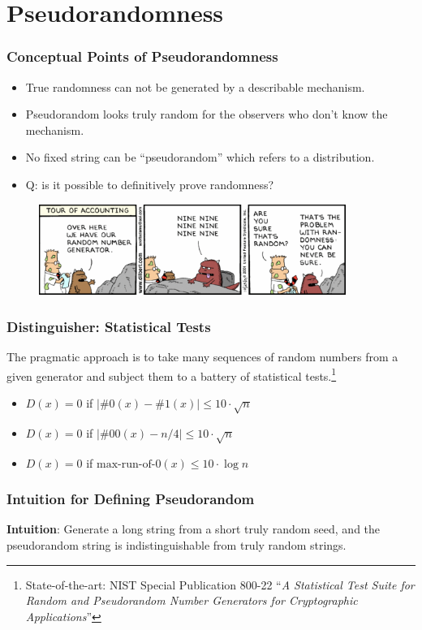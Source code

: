 \section{Pseudorandomness}
\begin{frame}\frametitle{Conceptual Points of Pseudorandomness}
\begin{itemize}
\item True randomness can not be generated by a describable mechanism.
\item Pseudorandom looks truly random for the observers who don't know the mechanism. 
\item No fixed string can be ``pseudorandom'' which refers to a distribution.
\item \alert{Q: is it possible to definitively prove randomness?}
\end{itemize}
\begin{figure}
\begin{center}
\includegraphics[width=100mm]{pic/random-color} 
\end{center}
\end{figure}
\end{frame}
\begin{frame}\frametitle{Distinguisher: Statistical Tests}
The pragmatic approach is to take many sequences of random numbers from a given generator and subject them to a battery of statistical tests.\footnote{State-of-the-art: NIST Special Publication 800-22 ``\emph{A Statistical Test Suite for Random and Pseudorandom Number Generators for Cryptographic Applications}''}
\begin{exampleblock}{}
\begin{itemize}
\item $D(x)=0$ if $\left| \#0(x) - \#1(x)\right| \le 10\cdot \sqrt{n}$
\item $D(x)=0$ if $\left| \#00(x) - n/4\right| \le 10\cdot \sqrt{n}$
\item $D(x)=0$ if $\text{max-run-of-}0(x) \le 10\cdot \log{n}$
\end{itemize}
\end{exampleblock}
\end{frame}
\begin{frame}\frametitle{Intuition for Defining Pseudorandom}
\textbf{Intuition}: Generate a long string from a short truly random seed, and the pseudorandom string is indistinguishable from truly random strings.
\begin{figure}
\begin{center}

\end{center}
\end{figure}
\end{frame}
